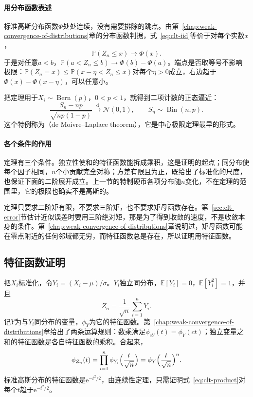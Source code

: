 \paragraph{用分布函数表述}
标准高斯分布函数$\Phi$处处连续，没有需要排除的跳点。由第~\ref{chap:weak-convergence-of-distributions}章的分布函数判据，式~\eqref{eq:clt-iid}等价于对每个实数$x$，
\begin{equation}
 \mathbb{P}(Z_n\leq x)\to\Phi(x) .
 \label{eq:clt-iid-cdf}
\end{equation}
于是对任意$a<b$，$\mathbb{P}(a<Z_n\leq b)\to\Phi(b)-\Phi(a)$。端点是否取等号不影响极限：$\mathbb{P}(Z_n=x)\leq\mathbb{P}(x-\eta<Z_n\leq x)$对每个$\eta>0$成立，右边趋于$\Phi(x)-\Phi(x-\eta)$，可以任意小。

把定理用于$X_i\sim\operatorname{Bern}(p)$，$0<p<1$，就得到二项计数的正态逼近：
\[
 \frac{S_n-np}{\sqrt{np(1-p)}}\xrightarrow{\mathrm{d}}\mathcal{N}(0,1),\qquad S_n\sim\operatorname{Bin}(n,p) .
\]
这个特例称为（de Moivre--Laplace theorem），它是中心极限定理最早的形式。

\paragraph{各个条件的作用}
定理有三个条件。独立性使和的特征函数能拆成乘积，这是证明的起点；同分布使每个因子相同，$n$个小贡献完全对称；方差有限且为正，既给出了标准化的尺度，也保证下面的二阶展开成立。上一节的特制硬币各项分布随$n$变化，不在定理的范围里，它的极限也确实不是高斯的。

定理只要求二阶矩有限，不要求三阶矩，也不要求矩母函数存在。第~\ref{sec:clt-error}节估计近似误差时要用三阶绝对矩，那是为了得到收敛的速度，不是收敛本身的条件。第~\ref{chap:weak-convergence-of-distributions}章说明过，矩母函数可能在零点附近的任何邻域都无穷，而特征函数总是存在，所以证明用特征函数。

\subsection{特征函数证明}
\label{sec:clt-iid-proof}

把$X_i$标准化，令$Y_i=(X_i-\mu)/\sigma$。$Y_i$独立同分布，$\mathbb{E}[Y_i]=0$，$\mathbb{E}[Y_i^2]=1$，并且
\[
 Z_n=\frac{1}{\sqrt{n}}\sum_{i=1}^{n}Y_i .
\]
记$Y$为与$Y_i$同分布的变量，$\phi_Y$为它的特征函数。第~\ref{chap:weak-convergence-of-distributions}章给出了两条运算规则：数乘满足$\phi_{cY}(t)=\phi_Y(ct)$；独立变量之和的特征函数是各自特征函数的乘积。合起来，
\begin{equation}
 \phi_{Z_n}(t)=\prod_{i=1}^{n}\phi_{Y_i}\Bigl(\frac{t}{\sqrt{n}}\Bigr)=\phi_Y\Bigl(\frac{t}{\sqrt{n}}\Bigr)^{n} .
 \label{eq:clt-product}
\end{equation}
标准高斯分布的特征函数是$\mathrm{e}^{-t^2/2}$，由连续性定理，只需证明式~\eqref{eq:clt-product}对每个$t$趋于$\mathrm{e}^{-t^2/2}$。


